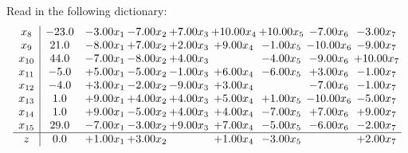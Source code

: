 \documentclass[9pt]{article}
\begin{document}
Read in the following dictionary:
\[\begin{array}{c| c c@{\hskip 2pt} c@{\hskip 2pt} c@{\hskip 2pt} c@{\hskip 2pt} c@{\hskip 2pt} c@{\hskip 2pt} c@{\hskip 2pt} }
 x_{8}   &  -23.0 & -3.00 x_{1} & -7.00 x_{2} & +  7.00 x_{3} & + 10.00 x_{4} & + 10.00 x_{5} & -7.00 x_{6} & -3.00 x_{7}\\
 x_{9}   &  21.0 & -8.00 x_{1} & +  7.00 x_{2} & +  2.00 x_{3} & +  9.00 x_{4} & -1.00 x_{5} & -10.00 x_{6} & -9.00 x_{7}\\
 x_{10}   &  44.0 & -7.00 x_{1} & -8.00 x_{2} & +  4.00 x_{3} &   & -4.00 x_{5} & -9.00 x_{6} & + 10.00 x_{7}\\
 x_{11}   &  -5.0 & +  5.00 x_{1} & -5.00 x_{2} & -1.00 x_{3} & +  6.00 x_{4} & -6.00 x_{5} & +  3.00 x_{6} & -1.00 x_{7}\\
 x_{12}   &  -4.0 & +  3.00 x_{1} & -2.00 x_{2} & -9.00 x_{3} & +  3.00 x_{4} &   & -7.00 x_{6} & -1.00 x_{7}\\
 x_{13}   &  1.0 & +  9.00 x_{1} & +  4.00 x_{2} & +  4.00 x_{3} & +  5.00 x_{4} & +  1.00 x_{5} & -10.00 x_{6} & -5.00 x_{7}\\
 x_{14}   &  1.0 & +  9.00 x_{1} & -5.00 x_{2} & +  4.00 x_{3} & +  4.00 x_{4} & -7.00 x_{5} & +  7.00 x_{6} & +  9.00 x_{7}\\
 x_{15}   &  29.0 & -7.00 x_{1} & -3.00 x_{2} & +  9.00 x_{3} & +  7.00 x_{4} & -5.00 x_{5} & -6.00 x_{6} & -2.00 x_{7}\\
\hline
z    &  0.0 & +  1.00 x_{1} & +  3.00 x_{2} &   & +  1.00 x_{4} & -3.00 x_{5} &   & +  2.00 x_{7}\\
\end{array}\]
\end{document}
